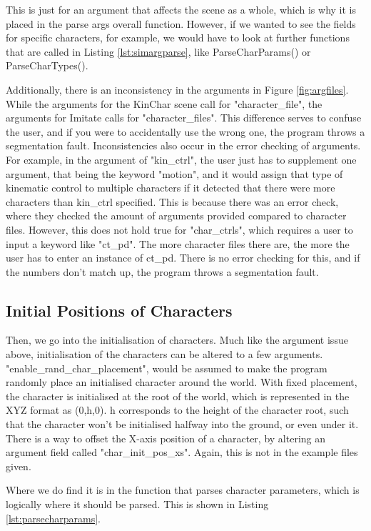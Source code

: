 \documentclass{l4proj}
\begin{document}
This is just for an argument that affects the scene as a whole, which is why it is placed in the parse args overall function. However, if we wanted to see the fields for specific characters, for example, we would have to look at further functions that are called in Listing \ref{lst:simargparse}, like ParseCharParams() or ParseCharTypes().

Additionally, there is an inconsistency in the arguments in Figure \ref{fig:argfiles}. While the arguments for the KinChar scene call for "character\_file", the arguments for Imitate calls for "character\_files". This difference serves to confuse the user, and if you were to accidentally use the wrong one, the program throws a segmentation fault. Inconsistencies also occur in the error checking of arguments. For example, in the argument of "kin\_ctrl", the user just has to supplement one argument, that being the keyword "motion", and it would assign that type of kinematic control to multiple characters if it detected that there were more characters than kin\_ctrl specified. This is because there was an error check, where they checked the amount of arguments provided compared to character files. However, this does not hold true for "char\_ctrls", which requires a user to input a keyword like "ct\_pd". The more character files there are, the more the user has to enter an instance of ct\_pd. There is no error checking for this, and if the numbers don't match up, the program throws a segmentation fault.

\subsection{Initial Positions of Characters}
Then, we go into the initialisation of characters. Much like the argument issue above, initialisation of the characters can be altered to a few arguments. "enable\_rand\_char\_placement", would be assumed to make the program randomly place an initialised character around the world. With fixed placement, the character is initialised at the root of the world, which is represented in the XYZ format as (0,h,0). h corresponds to the height of the character root, such that the character won't be initialised halfway into the ground, or even under it. There is a way to offset the X-axis position of a character, by altering an argument field called "char\_init\_pos\_xs". Again, this is not in the example files given. 

Where we do find it is in the function that parses character parameters, which is logically where it should be parsed. This is shown in Listing \ref{lst:parsecharparams}.
\end{document}
